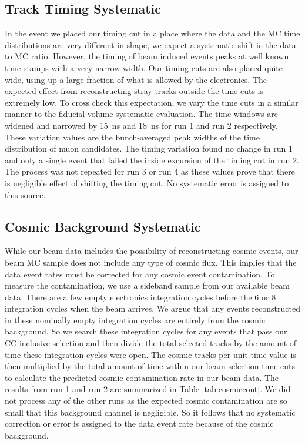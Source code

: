 \subsection{Track Timing Systematic}

In the event we placed our timing cut in a place where the data and the MC time distributions are very different in shape, we expect a systematic shift in the data to MC ratio. However, the timing of beam induced events peaks at well known time stamps with a very narrow width. Our timing cuts are also placed quite wide, using up a large fraction of what is allowed by the electronics. The expected effect from reconstructing stray tracks outside the time cuts is extremely low. To cross check this expectation, we vary the time cuts in a similar manner to the fiducial volume systematic evaluation. The time windows are widened and narrowed by 15~ns and 18~ns for run 1 and run 2 respectively. These variation values are the bunch-averaged peak widths of the time distribution of muon candidates. The timing variation found no change in run 1 and only a single event that failed the inside excursion of the timing cut in run 2. The process was not repeated for run 3 or run 4 as these values prove that there is negligible effect of shifting the timing cut. No systematic error is assigned to this source.

\subsection{Cosmic Background Systematic}

While our beam data includes the possibility of reconstructing cosmic events, our beam MC sample does not include any type of cosmic flux. This implies that the data event rates must be corrected for any cosmic event contamination. To measure the contamination, we use a sideband sample from our available beam data. There are a few empty electronics integration cycles before the 6 or 8 integration cycles when the beam arrives. We argue that any events reconstructed in these nominally empty integration cycles are entirely from the cosmic background. So we search these integration cycles for any events that pass our CC inclusive selection and then divide the total selected tracks by the amount of time these integration cycles were open. The cosmic tracks per unit time value is then multiplied by the total amount of time within our beam selection time cuts to calculate the predicted cosmic contamination rate in our beam data. The results from run 1 and run 2 are summarized in Table \ref{tab:cosmiccont}. We did not process any of the other runs as the expected cosmic contamination are so small that this background channel is negligible. So it follows that no systematic correction or error is assigned to the data event rate because of the cosmic background.

